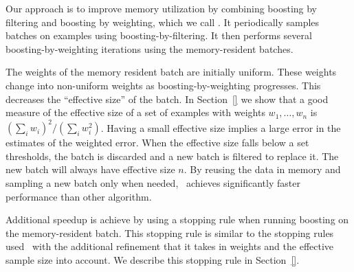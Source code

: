Our approach is to improve memory utilization by combining boosting by
filtering and boosting by weighting,
which we call \Sparrow.
It periodically samples
batches on examples using boosting-by-filtering. It then performs several
boosting-by-weighting iterations using the memory-resident batches.

The weights of the memory resident batch are initially uniform. These
weights change into non-uniform weights as boosting-by-weighting
progresses. This decreases the ``effective size'' of the batch. In
Section~\ref{} we show that a good measure of the effective size of a
set of examples with weights $w_1,\ldots,w_n$ is $(\sum_i w_i)^2 /
(\sum_i w_i^2)$. Having a small effective size implies a large error
in the estimates of the weighted error. When the effective size falls
below a set thresholds, the batch is discarded and a new batch is
filtered to replace it. The new batch will always have effective size
$n$. By reusing the data in memory and sampling a new batch only when
needed, \Sparrow\ achieves significantly faster performance than
other algorithm.

Additional speedup is achieve by using a stopping rule when
running boosting on the memory-resident batch. This stopping rule is
similar to the stopping rules
used~\cite{domingo_scaling_2000,bradley_filterboost:_2007} with the
additional refinement that it takes in weights and the effective
sample size into account. We describe this stopping rule in Section~\ref{}.
\fi
